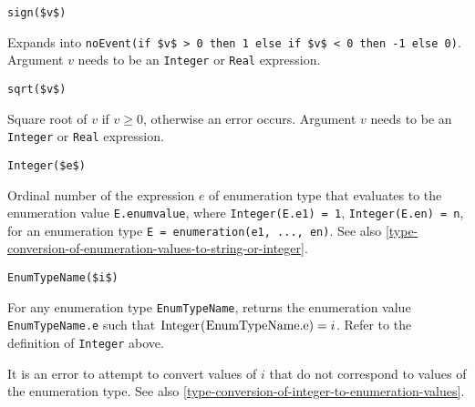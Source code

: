 \begin{functiondefinition}[sign]
\begin{synopsis}\begin{lstlisting}
sign($v$)
\end{lstlisting}\end{synopsis}
\begin{semantics}
Expands into \lstinline!noEvent(if $v$ > 0 then 1 else if $v$ < 0 then -1 else 0)!.  Argument $v$ needs to be an \lstinline!Integer! or \lstinline!Real! expression.
\end{semantics}
\end{functiondefinition}

\begin{functiondefinition}[sqrt]
\begin{synopsis}\begin{lstlisting}
sqrt($v$)
\end{lstlisting}\end{synopsis}
\begin{semantics}
Square root of $v$ if $v \geq 0$, otherwise an error occurs.  Argument $v$ needs to be an \lstinline!Integer! or \lstinline!Real! expression.
\end{semantics}
\end{functiondefinition}

\begin{operatordefinition*}[Integer]\label{modelica:integer-of-enumeration}
\begin{synopsis}\begin{lstlisting}
Integer($e$)
\end{lstlisting}\end{synopsis}
\begin{semantics}
Ordinal number of the expression $e$ of enumeration type that evaluates to the enumeration value \lstinline!E.enumvalue!, where \lstinline!Integer(E.e1) = 1!, \lstinline!Integer(E.en) = n!, for an enumeration type \lstinline!E = enumeration(e1, ..., en)!.  See also \cref{type-conversion-of-enumeration-values-to-string-or-integer}.
\end{semantics}
\end{operatordefinition*}

\begin{operatordefinition*}[<EnumTypeName>]\label{modelica:enumeration-of-integer}
\begin{synopsis}\begin{lstlisting}
EnumTypeName($i$)
\end{lstlisting}\end{synopsis}
\begin{semantics}
For any enumeration type \lstinline!EnumTypeName!, returns the enumeration value \lstinline!EnumTypeName.e! such that $\text{\lstinline!Integer(EnumTypeName.e)!} = i$.  Refer to the definition of \lstinline!Integer! above.

It is an error to attempt to convert values of $i$ that do not correspond to values of the enumeration type.  See also \cref{type-conversion-of-integer-to-enumeration-values}.
\end{semantics}
\end{operatordefinition*}


